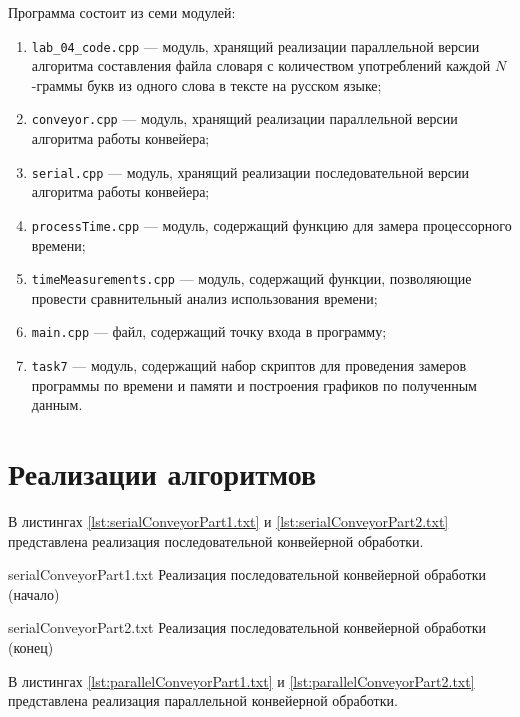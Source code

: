 Программа состоит из семи модулей: 

\begin{enumerate}[label={\arabic*)}]
	\item \texttt{lab\_04\_code.cpp} --- модуль, хранящий реализации параллельной версии алгоритма составления файла словаря с количеством употреблений каждой $N$-граммы букв из одного слова в тексте на русском языке;
	\item \texttt{conveyor.cpp} --- модуль, хранящий реализации параллельной версии алгоритма работы конвейера;
	\item \texttt{serial.cpp} --- модуль, хранящий реализации последовательной версии алгоритма работы конвейера;
	\item \texttt{processTime.cpp} --- модуль, содержащий функцию для замера процессорного времени;
	\item \texttt{timeMeasurements.cpp} --- модуль, содержащий функции, позволяющие провести сравнительный анализ использования времени;
	\item \texttt{main.cpp} --- файл, содержащий точку входа в программу;
	\item \texttt{task7} --- модуль, содержащий набор скриптов для проведения замеров программы по времени и памяти и построения графиков по полученным данным.
\end{enumerate}

\clearpage

\section{Реализации алгоритмов}

В листингах \ref{lst:serialConveyorPart1.txt} и \ref{lst:serialConveyorPart2.txt} представлена реализация последовательной конвейерной обработки.

{serialConveyorPart1.txt} %
{Реализация последовательной конвейерной обработки (начало)} %

\clearpage

{serialConveyorPart2.txt} %
{Реализация последовательной конвейерной обработки (конец)} %

\clearpage

В листингах \ref{lst:parallelConveyorPart1.txt} и \ref{lst:parallelConveyorPart2.txt} представлена реализация параллельной конвейерной обработки.

